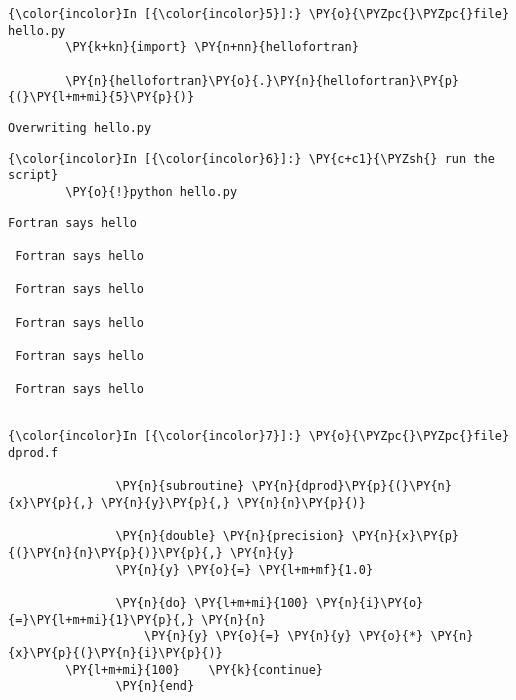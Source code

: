     \begin{Verbatim}[commandchars=\\\{\}]
{\color{incolor}In [{\color{incolor}5}]:} \PY{o}{\PYZpc{}\PYZpc{}file} hello.py
        \PY{k+kn}{import} \PY{n+nn}{hellofortran}
        
        \PY{n}{hellofortran}\PY{o}{.}\PY{n}{hellofortran}\PY{p}{(}\PY{l+m+mi}{5}\PY{p}{)}
\end{Verbatim}

    \begin{Verbatim}[commandchars=\\\{\}]
Overwriting hello.py

    \end{Verbatim}

    \begin{Verbatim}[commandchars=\\\{\}]
{\color{incolor}In [{\color{incolor}6}]:} \PY{c+c1}{\PYZsh{} run the script}
        \PY{o}{!}python hello.py
\end{Verbatim}

    \begin{Verbatim}[commandchars=\\\{\}]
 Fortran says hello

 Fortran says hello

 Fortran says hello

 Fortran says hello

 Fortran says hello

 Fortran says hello


    \end{Verbatim}



    \begin{Verbatim}[commandchars=\\\{\}]
{\color{incolor}In [{\color{incolor}7}]:} \PY{o}{\PYZpc{}\PYZpc{}file} dprod.f
        
               \PY{n}{subroutine} \PY{n}{dprod}\PY{p}{(}\PY{n}{x}\PY{p}{,} \PY{n}{y}\PY{p}{,} \PY{n}{n}\PY{p}{)}
            
               \PY{n}{double} \PY{n}{precision} \PY{n}{x}\PY{p}{(}\PY{n}{n}\PY{p}{)}\PY{p}{,} \PY{n}{y}
               \PY{n}{y} \PY{o}{=} \PY{l+m+mf}{1.0}
            
               \PY{n}{do} \PY{l+m+mi}{100} \PY{n}{i}\PY{o}{=}\PY{l+m+mi}{1}\PY{p}{,} \PY{n}{n}
                   \PY{n}{y} \PY{o}{=} \PY{n}{y} \PY{o}{*} \PY{n}{x}\PY{p}{(}\PY{n}{i}\PY{p}{)}
        \PY{l+m+mi}{100}    \PY{k}{continue}
               \PY{n}{end}
\end{Verbatim}

